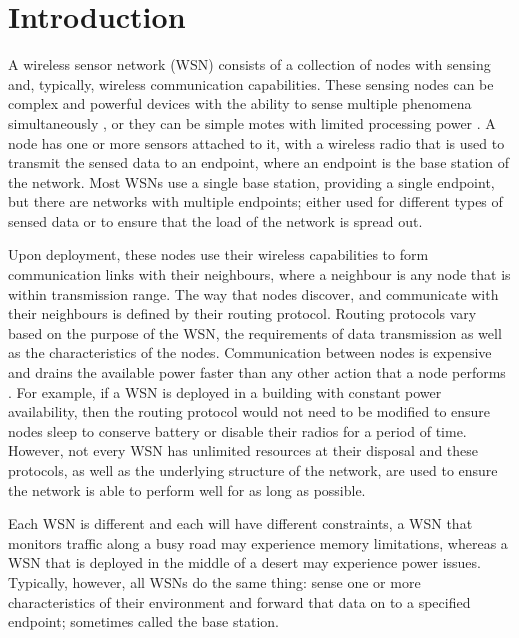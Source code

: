\chapter{Introduction}
A wireless sensor network (WSN) consists of a collection of nodes with sensing and, typically, wireless communication capabilities. These sensing nodes can be complex and powerful devices with the ability to sense multiple phenomena simultaneously \cite{Maurer, Nachman2008, Sarajevo2014}, or they can be simple motes with limited processing power \cite{Kays2009, Martinez2004, Szewczyk2004b}. A node has one or more sensors attached to it, with a wireless radio that is used to transmit the sensed data to an endpoint, where an endpoint is the base station of the network. Most WSNs use a single base station, providing a single endpoint, but there are networks with multiple endpoints; either used for different types of sensed data or to ensure that the load of the network is spread out.

Upon deployment, these nodes use their wireless capabilities to form communication links with their neighbours, where a neighbour is any node that is within transmission range. The way that nodes discover, and communicate with their neighbours is defined by their routing protocol. Routing protocols vary based on the purpose of the WSN, the requirements of data transmission as well as the characteristics of the nodes. Communication between nodes is expensive and drains the available power faster than any other action that a node performs \cite{Raghunathan2002}. For example, if a WSN is deployed in a building with constant power availability, then the routing protocol would not need to be modified to ensure nodes sleep to conserve battery or disable their radios for a period of time. However, not every WSN has unlimited resources at their disposal and these protocols, as well as the underlying structure of the network, are used to ensure the network is able to perform well for as long as possible.

Each WSN is different and each will have different constraints, a WSN that monitors traffic along a busy road may experience memory limitations, whereas a  WSN that is deployed in the middle of a desert may experience power issues. Typically, however, all WSNs do the same thing: sense one or more characteristics of their environment and forward that data on to a specified endpoint; sometimes called the base station.

